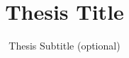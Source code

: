 \documentclass[11pt,a4paper,oneside]{book}
\title{Thesis Title}
\subtitle{Thesis Subtitle (optional)}
\begin{document}
	\preface
	
	
	
	
	
	

	
	

    \appendix
    \appendixpage
	

%	

	\backcover
\end{document}
